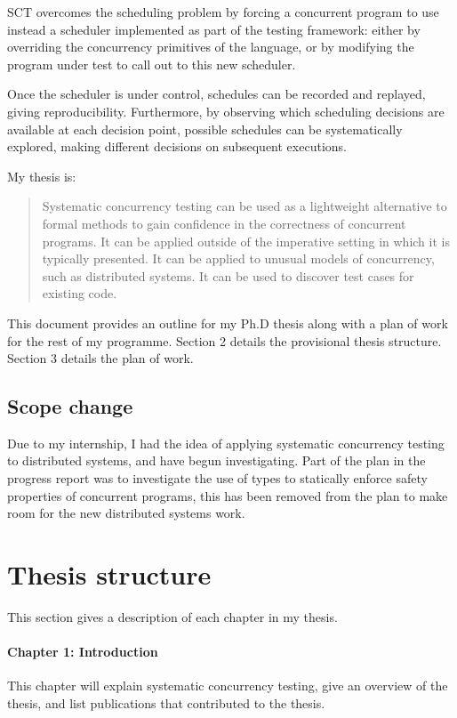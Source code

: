 \documentclass{article}
\begin{document}
SCT overcomes the scheduling problem by forcing a concurrent program
to use instead a scheduler implemented as part of the testing
framework: either by overriding the concurrency primitives of the
language, or by modifying the program under test to call out to this
new scheduler.

Once the scheduler is under control, schedules can be recorded and
replayed, giving reproducibility. Furthermore, by observing which
scheduling decisions are available at each decision point, possible
schedules can be systematically explored, making different decisions
on subsequent executions.

My thesis is:

\begin{quote}
  Systematic concurrency testing can be used as a lightweight
  alternative to formal methods to gain confidence in the correctness
  of concurrent programs. It can be applied outside of the imperative
  setting in which it is typically presented. It can be applied to
  unusual models of concurrency, such as distributed systems. It can
  be used to discover test cases for existing code.
\end{quote}

This document provides an outline for my Ph.D thesis along with a plan
of work for the rest of my programme. Section 2 details the
provisional thesis structure. Section 3 details the plan of work.

\subsection{Scope change}

Due to my internship, I had the idea of applying systematic
concurrency testing to distributed systems, and have begun
investigating. Part of the plan in the progress report was to
investigate the use of types to statically enforce safety properties
of concurrent programs, this has been removed from the plan to make
room for the new distributed systems work.

\section{Thesis structure}

This section gives a description of each chapter in my thesis.

\paragraph{Chapter 1: Introduction} This chapter will explain
systematic concurrency testing, give an overview of the thesis, and
list publications that contributed to the thesis.
\end{document}
